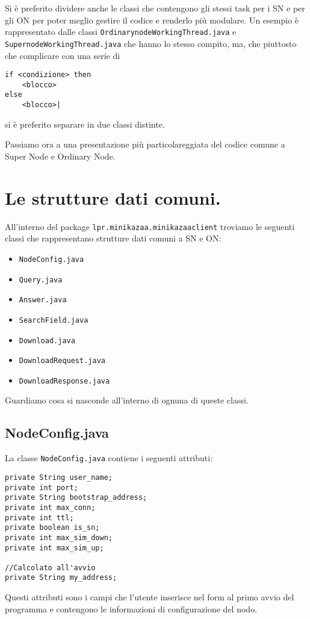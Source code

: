 Si è preferito dividere anche le classi che contengono gli stessi task per i SN e per gli ON per poter meglio gestire il codice e renderlo più modulare.
Un esempio è rappresentato dalle classi \verb|OrdinarynodeWorkingThread.java| e \verb|SupernodeWorkingThread.java| che hanno lo stesso compito, ma, che piuttosto che complicare con una serie di 
\begin{verbatim}
if <condizione> then 
	<blocco> 
else 
	<blocco>|
\end{verbatim}
si è preferito separare in due classi distinte.

Passiamo ora a una presentazione più particolareggiata del codice comune a Super Node e Ordinary Node.

\section{Le strutture dati comuni.}
All'interno del package \verb|lpr.minikazaa.minikazaaclient| troviamo le seguenti classi che rappresentano strutture dati comuni a SN e ON:
\begin{itemize}
 \item \verb|NodeConfig.java|
 \item \verb|Query.java|
 \item \verb|Answer.java|
 \item \verb|SearchField.java|
 \item \verb|Download.java|
 \item \verb|DownloadRequest.java|
 \item \verb|DownloadResponse.java|
\end{itemize}

Guardiamo cosa si nasconde all'interno di ognuna di queste classi.

\subsection{NodeConfig.java}
La classe \verb|NodeConfig.java| contiene i seguenti attributi:
\newline
\begin{lstlisting}
private String user_name;
private int port;
private String bootstrap_address;
private int max_conn;
private int ttl;
private boolean is_sn;
private int max_sim_down;
private int max_sim_up;

//Calcolato all'avvio
private String my_address;
\end{lstlisting}

Questi attributi sono i campi che l'utente inserisce nel form al primo avvio del programma e contengono le informazioni di configurazione del nodo. 


